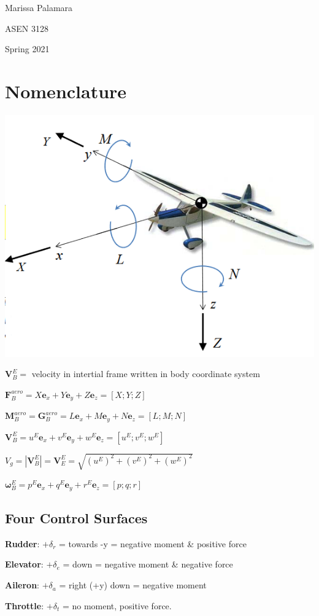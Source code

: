\documentclass{article}
\begin{document}
\begin{multicols*}{3}
    Marissa Palamara\par 
    ASEN 3128\par 
    Spring 2021
    \vspace{-0.5cm}

\section*{Nomenclature}
\includegraphics[width=0.75\linewidth]{Images/Body_Frame.png}\par
$\mathbf{V}_B^E = $ velocity in intertial frame written in body coordinate system\par 
$\mathbf{F}_B^{aero}= X\mathbf{e}_x+Y\mathbf{e}_y+Z\mathbf{e}_z=[X;Y;Z]$\par 
$\mathbf{M}_B^{aero}=\mathbf{G}_B^{aero}=L\mathbf{e}_x+M\mathbf{e}_y+N\mathbf{e}_z=[L;M;N]$\par 
$\mathbf{V}_B^E=u^E\mathbf{e}_x+v^E\mathbf{e}_y+w^E\mathbf{e}_z=[u^E;v^E;w^E]$\par 
$V_g=|\mathbf{V}_B^E|=\mathbf{V}_E^E=\sqrt{(u^E)^2+(v^E)^2+(w^E)^2}$\par 
$\mathbf{\omega}_B^E=p^E\mathbf{e}_x+q^E\mathbf{e}_y+r^E\mathbf{e}_z=[p;q;r]$\par 
\subsection*{Four Control Surfaces}
\textbf{Rudder}: $+\delta_r$ = towards -y = negative moment \& positive force\par 
\textbf{Elevator}: $+\delta_e$ = down = negative moment \& negative force\par 
\textbf{Aileron}: $+\delta_a$ = right (+y) down = negative moment\par 
\textbf{Throttle}: $+\delta_t$ = no moment, positive force.\par 

\end{multicols*}
\end{document}
